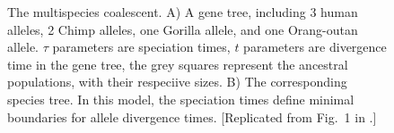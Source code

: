 \documentclass[11pt]{article}
\begin{document}
\begin{figure}[h!]
\centering
{}
\caption{\small The multispecies coalescent. A) A gene tree, including 3 human alleles, 2 Chimp alleles, one Gorilla allele, and one Orang-outan allele. $\tau$ parameters are speciation times, $t$ parameters are divergence time in the gene tree, the grey squares represent the ancestral populations, with their respeciive sizes.  B) The corresponding species tree. In this model, the speciation times define minimal boundaries for allele divergence times. [Replicated from Fig.~1 in \citet{Rannala2003}.]}
\label{fig2}
\end{figure}


\vspace{5mm}
\end{document}
